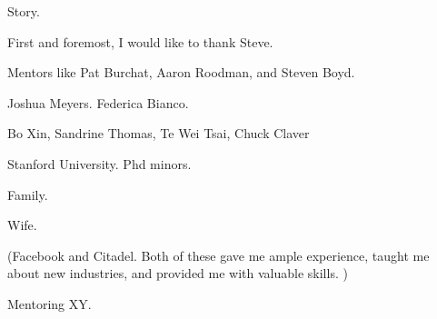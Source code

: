 Story.

First and foremost, I would like to thank Steve.

Mentors like Pat Burchat, Aaron Roodman, and Steven Boyd. 

Joshua Meyers. Federica Bianco. 

Bo Xin, Sandrine Thomas, Te Wei Tsai, Chuck Claver

Stanford University. Phd minors.

Family.

Wife.

(Facebook and Citadel. Both of these gave me ample experience, taught me about new industries, and provided me with valuable skills. )

Mentoring XY. 